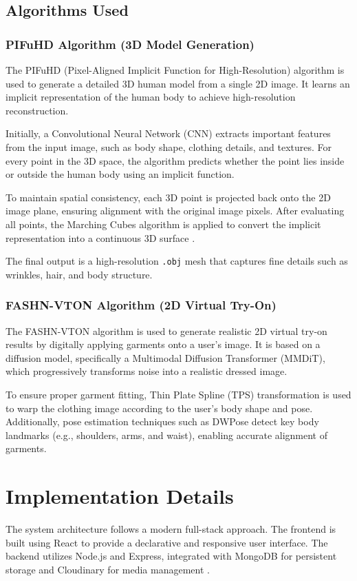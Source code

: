 \documentclass[12pt,a4paper,oneside]{report}
\begin{document}
\subsection{Algorithms Used}

\subsubsection{PIFuHD Algorithm (3D Model Generation)}
The PIFuHD (Pixel-Aligned Implicit Function for High-Resolution) algorithm \cite{1} is used to generate a detailed 3D human model from a single 2D image. It learns an implicit representation of the human body to achieve high-resolution reconstruction.

Initially, a Convolutional Neural Network (CNN) extracts important features from the input image, such as body shape, clothing details, and textures. For every point in the 3D space, the algorithm predicts whether the point lies inside or outside the human body using an implicit function.

To maintain spatial consistency, each 3D point is projected back onto the 2D image plane, ensuring alignment with the original image pixels. After evaluating all points, the Marching Cubes algorithm is applied to convert the implicit representation into a continuous 3D surface \cite{6}.

The final output is a high-resolution \texttt{.obj} mesh that captures fine details such as wrinkles, hair, and body structure.



\subsubsection{FASHN-VTON Algorithm (2D Virtual Try-On)}
The FASHN-VTON algorithm \cite{16} is used to generate realistic 2D virtual try-on results by digitally applying garments onto a user’s image. It is based on a diffusion model, specifically a Multimodal Diffusion Transformer (MMDiT), which progressively transforms noise into a realistic dressed image.

To ensure proper garment fitting, Thin Plate Spline (TPS) transformation is used to warp the clothing image according to the user’s body shape and pose. Additionally, pose estimation techniques such as DWPose \cite{9} detect key body landmarks (e.g., shoulders, arms, and waist), enabling accurate alignment of garments.

\section{Implementation Details}
The system architecture follows a modern full-stack approach. The frontend is built using React to provide a declarative and responsive user interface. The backend utilizes Node.js and Express, integrated with MongoDB for persistent storage and Cloudinary for media management \cite{19}.
\end{document}
